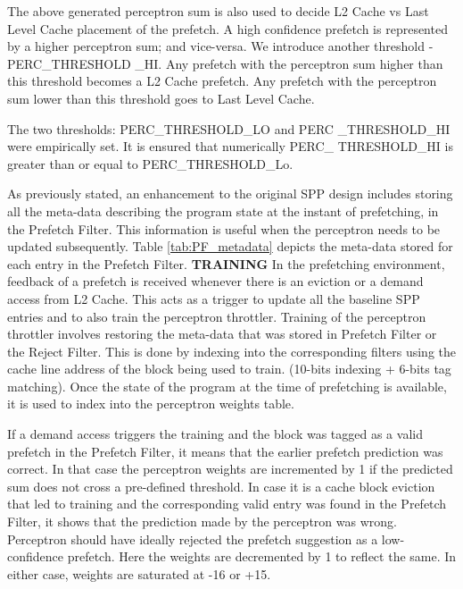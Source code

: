 \documentclass{sig-alternate}
\begin{document}
The above generated perceptron sum is also used to decide L2 Cache vs Last Level Cache placement of the prefetch. A high confidence prefetch is represented by a higher perceptron sum; and vice-versa. We introduce another threshold - PERC\_THRESHOLD \_HI. Any prefetch with the perceptron sum higher than this threshold becomes a L2 Cache prefetch. Any prefetch with the perceptron sum lower than this threshold goes to Last Level Cache.

The two thresholds: PERC\_THRESHOLD\_LO and PERC \_THRESHOLD\_HI were empirically set. It is ensured that numerically PERC\_ THRESHOLD\_HI is greater than or equal to PERC\_THRESHOLD\_Lo.

As previously stated, an enhancement to the original SPP design includes storing all the meta-data describing the program state at the instant of prefetching, in the Prefetch Filter. This information is useful when the perceptron needs to be updated subsequently. Table \ref{tab:PF_metadata} depicts the meta-data stored for each entry in the Prefetch Filter.\newline
\newline
\textbf{TRAINING}\newline
In the prefetching environment, feedback of a prefetch is received whenever there is an eviction or a demand access from L2 Cache. This acts as a trigger to update all the baseline SPP entries and to also train the perceptron throttler. Training of the perceptron throttler involves restoring the meta-data that was stored in Prefetch Filter or the Reject Filter. This is done by indexing into the corresponding filters using the cache line address of the block being used to train. (10-bits indexing + 6-bits tag matching). Once the state of the program at the time of prefetching is available, it is used to index into the perceptron weights table. 


If a demand access triggers the training and the block was tagged as a valid prefetch in the Prefetch Filter, it means that the earlier prefetch prediction was correct. In that case the perceptron weights are incremented by 1 if the predicted sum does not cross a pre-defined threshold.  In case it is a cache block eviction that led to training and the corresponding valid entry was found in the Prefetch Filter, it shows that the prediction made by the perceptron was wrong. Perceptron should have ideally rejected the prefetch suggestion as a low-confidence prefetch. Here the weights are decremented by 1 to reflect the same. In either case, weights are saturated at -16 or +15.
\end{document}
